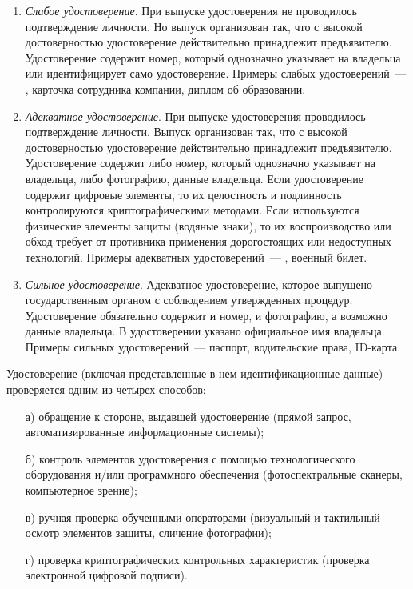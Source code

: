\begin{enumerate}
\item
{\it Слабое удостоверение}. 
При выпуске удостоверения не проводилось подтверждение личности.
Но выпуск организован так, что с высокой достоверностью
удостоверение действительно принадлежит предъявителю. 
Удостоверение содержит номер, который однозначно указывает на владельца
или идентифицирует само удостоверение.
%
Примеры слабых удостоверений~--- 
,
карточка сотрудника компании,
диплом об образовании.


\item
{\it Адекватное удостоверение}. 
При выпуске удостоверения проводилось подтверждение личности.
Выпуск организован так, что с высокой достоверностью
удостоверение действительно принадлежит предъявителю. 
%
Удостоверение содержит либо номер, который однозначно указывает на 
владельца, либо фотографию,  данные владельца.
% 
Если удостоверение содержит цифровые элементы, то их целостность и 
подлинность контролируются криптографическими методами. 
%
Если используются физические элементы защиты (водяные знаки),  
то их воспроизводство или обход требует от противника применения 
дорогостоящих или недоступных технологий. 
%
Примеры адекватных удостоверений~--- ,
военный билет.

\item
{\it Сильное удостоверение}. 
Адекватное удостоверение, которое выпущено государственным органом с 
соблюдением утвержденных процедур. Удостоверение обязательно содержит 
и номер, и фотографию, а возможно  данные владельца.
В удостоверении указано официальное имя владельца.
%
Примеры сильных удостоверений~--- паспорт, водительские права, ID-карта.
\end{enumerate}

Удостоверение (включая представленные в нем идентификационные данные) 
проверяется одним из четырех способов:
\begin{enumerate}
\item[а)]
обращение к стороне, выдавшей удостоверение (прямой запрос, 
автоматизированные информационные системы);
%
%
\item[б)]
контроль элементов удостоверения с помощью технологического оборудования 
и/или программного обеспечения (фотоспектральные сканеры, компьютерное 
зрение);
%
%
\item[в)]
ручная проверка обученными операторами (визуальный и тактильный осмотр 
элементов защиты, сличение фотографии);
%

\item[г)]
проверка криптографических контрольных характеристик
(проверка электронной цифровой подписи).
%
%
\end{enumerate}

